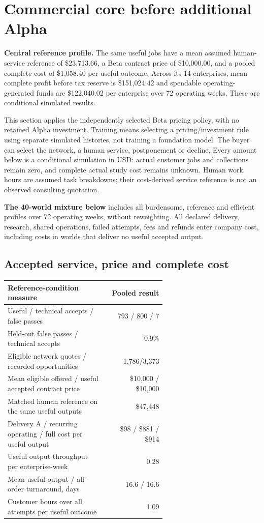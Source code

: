 \section{Commercial core before additional Alpha}\label{sec:commercial-core-results}

\textbf{Central reference profile.} The same useful jobs have a mean assumed human-service reference of \$23,713.66, a Beta contract price of \$10,000.00, and a pooled complete cost of \$1,058.40 per useful outcome. Across its 14 enterprises, mean complete profit before tax reserve is \$151,024.42 and spendable operating-generated funds are \$122,040.02 per enterprise over 72 operating weeks. These are conditional simulated results.

This section applies the independently selected Beta pricing policy, with no retained Alpha investment. Training means selecting a pricing/investment rule using separate simulated histories, not training a foundation model. The buyer can select the network, a human service, postponement or decline. Every amount below is a conditional simulation in USD: actual customer jobs and collections remain zero, and complete actual study cost remains unknown. Human work hours are assumed task breakdowns; their cost-derived service reference is not an observed consulting quotation.

\textbf{The 40-world mixture below} includes all burdensome, reference and efficient profiles over 72 operating weeks, without reweighting. All declared delivery, research, shared operations, failed attempts, fees and refunds enter company cost, including costs in worlds that deliver no useful accepted output.

\subsection{Accepted service, price and complete cost}

{\small
\setlength{\tabcolsep}{4pt}
\begin{tabular}{@{}p{0.62\linewidth}r@{}}
\toprule
Reference-condition measure & Pooled result \\
\midrule
Useful / technical accepts / false passes & 793 / 800 / 7 \\
Held-out false passes / technical accepts & 0.9\% \\
Eligible network quotes / recorded opportunities & 1,786/3,373 \\
Mean eligible offered / useful accepted contract price & \$10,000 / \$10,000 \\
Matched human reference on the same useful outputs & \$47,448 \\
Delivery A / recurring operating / full cost per useful output & \$98 / \$881 / \$914 \\
Useful output throughput per enterprise-week & 0.28 \\
Mean useful-output / all-order turnaround, days & 16.6 / 16.6 \\
Customer hours over all attempts per useful outcome & 1.09 \\
\bottomrule
\end{tabular}
}

